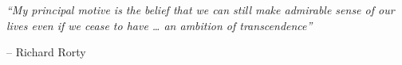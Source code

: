 \thispagestyle{empty}
\begin{center}
\large{\textit{``My principal motive is the belief that we can still make admirable sense of our lives even if we cease to have … an ambition of transcendence''}}
\end{center}
\begin{flushright}
-- Richard Rorty
\end{flushright}
\clearpage

